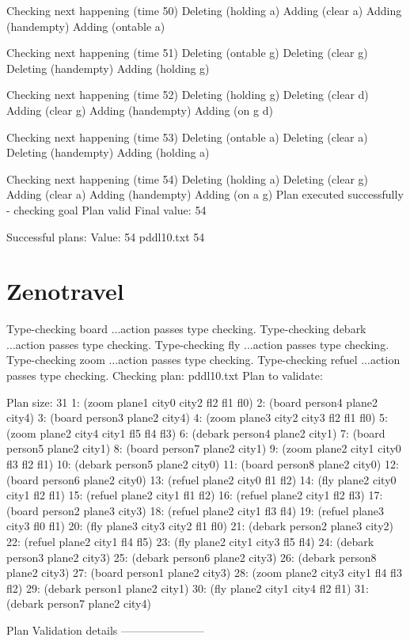 Checking next happening (time 50)
Deleting (holding a)
Adding (clear a)
Adding (handempty)
Adding (ontable a)

Checking next happening (time 51)
Deleting (ontable g)
Deleting (clear g)
Deleting (handempty)
Adding (holding g)

Checking next happening (time 52)
Deleting (holding g)
Deleting (clear d)
Adding (clear g)
Adding (handempty)
Adding (on g d)

Checking next happening (time 53)
Deleting (ontable a)
Deleting (clear a)
Deleting (handempty)
Adding (holding a)

Checking next happening (time 54)
Deleting (holding a)
Deleting (clear g)
Adding (clear a)
Adding (handempty)
Adding (on a g)
Plan executed successfully - checking goal
Plan valid
Final value: 54 

Successful plans:
Value: 54
 pddl10.txt 54 
\section{Zenotravel}
Type-checking board
...action passes type checking.
Type-checking debark
...action passes type checking.
Type-checking fly
...action passes type checking.
Type-checking zoom
...action passes type checking.
Type-checking refuel
...action passes type checking.
Checking plan: pddl10.txt
Plan to validate:

Plan size: 31
1:
(zoom plane1 city0 city2 fl2 fl1 fl0)
2:
(board person4 plane2 city4)
3:
(board person3 plane2 city4)
4:
(zoom plane3 city2 city3 fl2 fl1 fl0)
5:
(zoom plane2 city4 city1 fl5 fl4 fl3)
6:
(debark person4 plane2 city1)
7:
(board person5 plane2 city1) 
8:
(board person7 plane2 city1) 
9:
(zoom plane2 city1 city0 fl3 fl2 fl1)
10:
(debark person5 plane2 city0)
11:
(board person8 plane2 city0)
12:
(board person6 plane2 city0)
13:
(refuel plane2 city0 fl1 fl2)
14:
(fly plane2 city0 city1 fl2 fl1)
15:
(refuel plane2 city1 fl1 fl2)
16:
(refuel plane2 city1 fl2 fl3)
17:
(board person2 plane3 city3)
18:
(refuel plane2 city1 fl3 fl4)
19:
(refuel plane3 city3 fl0 fl1)
20:
(fly plane3 city3 city2 fl1 fl0)
21:
(debark person2 plane3 city2)
22:
(refuel plane2 city1 fl4 fl5)
23:
(fly plane2 city1 city3 fl5 fl4)
24:
(debark person3 plane2 city3)
25:
(debark person6 plane2 city3)
26:
(debark person8 plane2 city3)
27:
(board person1 plane2 city3)
28:
(zoom plane2 city3 city1 fl4 fl3 fl2)
29:
(debark person1 plane2 city1)
30:
(fly plane2 city1 city4 fl2 fl1)
31:
(debark person7 plane2 city4)

Plan Validation details
-----------------------

